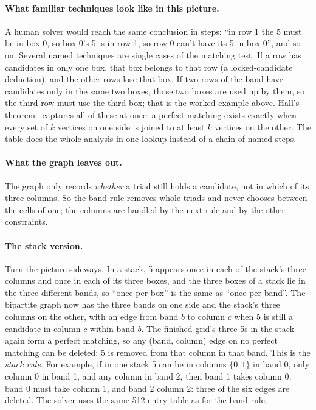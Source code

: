 \documentclass[11pt]{article}
\theoremstyle{definition}
\theoremstyle{plain}
\begin{document}
\paragraph{What familiar techniques look like in this picture.} A human solver would reach the same conclusion in
steps: ``in row 1 the 5 must be in box 0, so box 0's 5 is in row 1, so row 0 can't have its 5 in box 0'', and so on.
Several named techniques are single cases of the matching test. If a row has candidates in only one box, that box
belongs to that row (a locked-candidate deduction), and the other rows lose that box. If two rows of the band have
candidates only in the same two boxes, those two boxes are used up by them, so the third row must use the third box;
that is the worked example above.
Hall's theorem~\cite{hall1935representatives} captures all of these at once: a perfect matching exists exactly when
every set of $k$ vertices on one side is joined to at least $k$ vertices on the other. The table does the whole
analysis in one lookup instead of a chain of named steps.

\paragraph{What the graph leaves out.} The graph only records \emph{whether} a triad still holds a candidate, not in
which of its three columns. So the band rule removes whole triads and never chooses between the cells of one; the
columns are handled by the next rule and by the other constraints.

\paragraph{The stack version.} Turn the picture sideways. In a stack, 5 appears once in each of the stack's three
columns and once in each of its three boxes, and the three boxes of a stack lie in the three different bands, so
``once per box'' is the same as ``once per band''. The bipartite graph now has the three bands on one side and the
stack's three columns on the other, with an edge from band $b$ to column $c$ when 5 is still a candidate in column $c$
within band $b$. The finished grid's three 5s in the stack again form a perfect matching, so any (band, column) edge on
no perfect matching can be deleted: 5 is removed from that column in that band. This is the \emph{stack rule}. For
example, if in one stack 5 can be in columns $\{0,1\}$ in band 0, only column 0 in band 1, and any column in band 2,
then band 1 takes column 0, band 0 must take column 1, and band 2 column 2: three of the six edges are deleted. The
solver uses the same 512-entry table as for the band rule.
\end{document}
